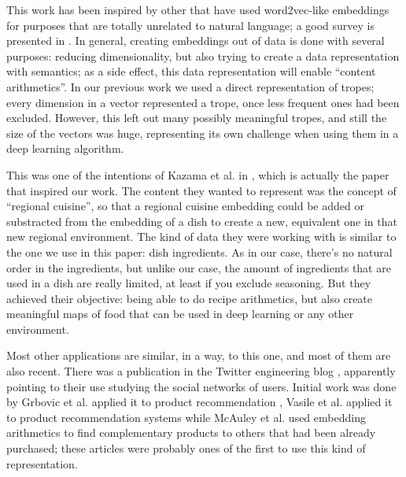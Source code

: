 \documentclass[letterpaper]{article}
\begin{document}
        This work has been inspired by other that have used
        word2vec-like embeddings for purposes that are totally
        unrelated to natural language; a good survey is presented in
        \cite{nonnlp19}. In general, creating embeddings out of data
        is done with several purposes: reducing dimensionality, but
        also trying to create a data representation with semantics; as
        a side effect, this data representation will enable ``content
        arithmetics''. In our previous work
        \cite{doi:10.1111/exsy.12525} we used a direct representation
        of tropes; every dimension in a vector represented a trope,
        once less frequent ones had been excluded. However, this left
        out many possibly meaningful tropes, and still the size of the
        vectors was huge, representing its own challenge when using
        them in a deep learning algorithm.

        This was one of the intentions of Kazama et al. in
        \cite{kazama2018}, which is actually the paper that inspired
        our work. The content they wanted to represent was the concept
        of ``regional cuisine'', so that a regional cuisine embedding
        could be added or substracted from the embedding of a dish to
        create a new, equivalent one in that new regional
        environment. The kind of data they were working with is
        similar to the one we use in this paper: dish ingredients. As
        in our case, there's no natural order in the ingredients, but
        unlike our case, the amount of ingredients that are used in a
        dish are really limited, at least if you exclude
        seasoning. But they achieved their objective: being able to do
        recipe arithmetics, but also create meaningful maps of food
        that can be used in deep learning or any other environment.

        Most other applications are similar, in a way, to this one,
        and most of them are also recent. There was a publication in
        the Twitter engineering blog \cite{twitter:embeddings},
        apparently pointing to their use studying the social networks
        of users. Initial work was done by Grbovic et al. applied it to product recommendation
        \cite{Grbovic2015}, Vasile et al. applied it to product
        recommendation systems \cite{vasile2016} while McAuley et
        al. \cite{DBLP:journals/corr/McAuleyPL15} used embedding
        arithmetics to find complementary products to others that had
        been already purchased; these articles were
        probably ones of the first to use this kind of
        representation.
\end{document}

